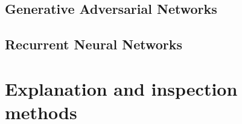 \documentclass[
]{book}
\begin{document}
\hypertarget{generative-adversarial-networks}{%
\section{Generative Adversarial Networks}\label{generative-adversarial-networks}}

\hypertarget{recurrent-neural-networks}{%
\section{Recurrent Neural Networks}\label{recurrent-neural-networks}}

\hypertarget{explanation-and-inspection-methods}{%
\chapter{Explanation and inspection methods}\label{explanation-and-inspection-methods}}

  
\end{document}
